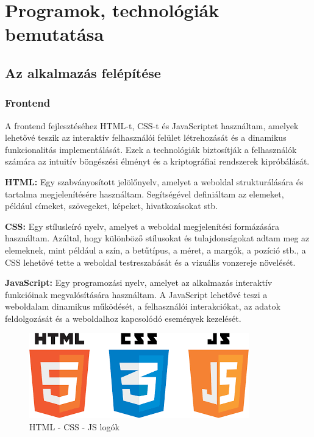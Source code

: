 \chapter{Programok, technológiák bemutatása} \label{fejezet2}

\section {Az alkalmazás felépítése}

\subsection{Frontend}

A frontend fejlesztéséhez HTML-t, CSS-t és JavaScriptet használtam, amelyek lehetővé teszik az interaktív felhasználói felület létrehozását és a dinamikus funkcionalitás implementálását. Ezek a technológiák biztosítják a felhasználók számára az intuitív böngészési élményt és a kriptográfiai rendszerek kipróbálását.

\textbf{HTML:}
Egy szabványosított jelölőnyelv, amelyet a weboldal strukturálására és tartalma megjelenítésére használtam. Segítségével definiáltam az elemeket, például címeket, szövegeket, képeket, hivatkozásokat stb.

\textbf{CSS:}
Egy stílusleíró nyelv, amelyet a weboldal megjelenítési formázására használtam. Azáltal, hogy különböző stílusokat és tulajdonságokat adtam meg az elemeknek, mint például a szín, a betűtípus, a méret, a margók, a pozíció stb., a CSS lehetővé tette a weboldal testreszabását és a vizuális vonzereje növelését.

\textbf{JavaScript:}
Egy programozási nyelv, amelyet az alkalmazás interaktív funkcióinak megvalósítására használtam. A JavaScript lehetővé teszi a weboldalam dinamikus működését, a felhasználói interakciókat, az adatok feldolgozását és a weboldalhoz kapcsolódó események kezelését.

\begin{figure}[!h]
	\centering
	\includegraphics[scale=0.3]{images/logoHtmlCssJs}
	\caption{HTML - CSS - JS logók}
\end{figure}


